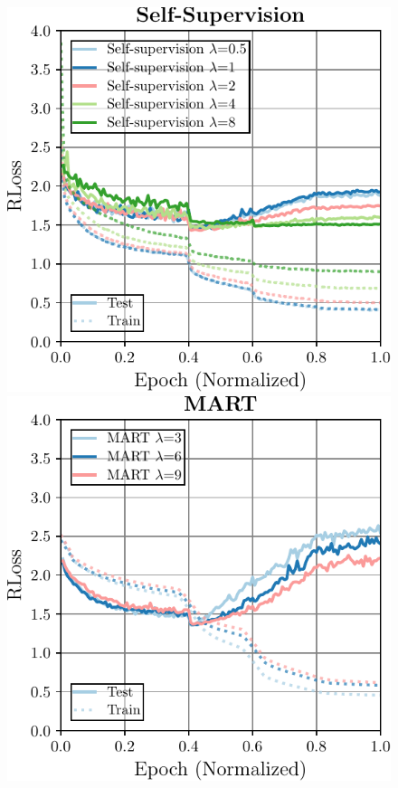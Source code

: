 \begin{figure}[t]
\begin{minipage}[t]{0.23\textwidth}
	\end{minipage}
	\\[2.5px]
	\begin{minipage}[t]{0.23\textwidth}
		\includegraphics[width=\textwidth]{plots_supp_understanding_ablation_ssl}
	\end{minipage}
	\begin{minipage}[t]{0.23\textwidth}
		\includegraphics[width=\textwidth]{plots_supp_understanding_ablation_mart}

\end{minipage}
\end{figure}
